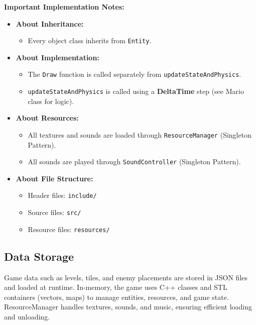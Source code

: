 \begin{flushleft}
\textbf{Important Implementation Notes:}
\begin{itemize}
    \item \textbf{About Inheritance:}
    \begin{itemize}
        \item Every object class inherits from \texttt{Entity}.
    \end{itemize}
    \item \textbf{About Implementation:}
    \begin{itemize}
        \item The \texttt{Draw} function is called separately from \texttt{updateStateAndPhysics}.
        \item \texttt{updateStateAndPhysics} is called using a \textbf{DeltaTime} step (see Mario class for logic).
    \end{itemize}
    \item \textbf{About Resources:}
    \begin{itemize}
        \item All textures and sounds are loaded through \texttt{ResourceManager} (Singleton Pattern).
        \item All sounds are played through \texttt{SoundController} (Singleton Pattern).
    \end{itemize}
    \item \textbf{About File Structure:}
    \begin{itemize}
        \item Header files: \texttt{include/}
        \item Source files: \texttt{src/}
        \item Resource files: \texttt{resources/}
    \end{itemize}
\end{itemize}

\begin{flushleft}
\section{Data Storage}
Game data such as levels, tiles, and enemy placements are stored in JSON files and loaded at runtime. In-memory, the game uses C++ classes and STL containers (vectors, maps) to manage entities, resources, and game state. ResourceManager handles textures, sounds, and music, ensuring efficient loading and unloading.


\end{flushleft}
\end{flushleft}
